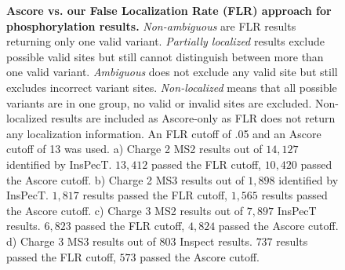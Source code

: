 \documentclass[arial,11pt]{article}
\begin{document}
\begin{figure}[h!]
\centering
\vspace{-0.9in}
\vspace{-0.9in}
\caption{\footnotesize {\bf Ascore vs. our False Localization Rate (FLR) approach for phosphorylation results.} {\em Non-ambiguous} are FLR results returning only one valid variant. {\em Partially localized} results exclude possible valid sites but still cannot distinguish between more than one valid variant. {\em Ambiguous} does not exclude any valid site but still excludes incorrect variant sites. {\em Non-localized} means that all possible variants are in one group, no valid or invalid sites are excluded. Non-localized results are included as Ascore-only as FLR does not return any localization information. An FLR cutoff of .05 and an Ascore cutoff of 13 was used. a) Charge 2 MS2 results out of $14,127$ identified by InsPecT. $13,412$ passed the FLR cutoff, $10,420$ passed the Ascore cutoff. b) Charge 2 MS3 results out of $1,898$ identified by InsPecT. $1,817$ results passed the FLR cutoff, $1,565$ results passed the Ascore cutoff. c) Charge 3 MS2 results out of $7,897$ InsPecT results. $6,823$ passed the FLR cutoff, $4,824$ passed the Ascore cutoff. d) Charge 3 MS3 results out of $803$ Inspect results. $737$ results passed the FLR cutoff, $573$ passed the Ascore cutoff.}
\label{AScoreLPCompare}
\end{figure}
\end{document}
